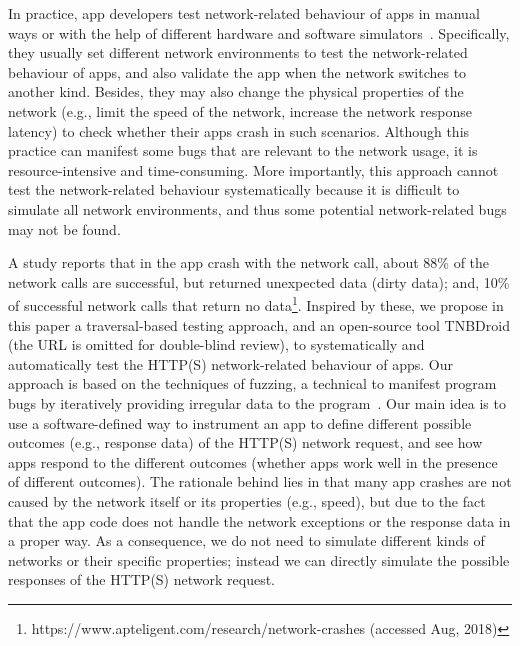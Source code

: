 \documentclass[sigconf,review, anonymous]{acmart}
\begin{document}
In practice, app developers test network-related behaviour of apps in manual ways or with the help of different hardware and software simulators~\cite{LBZKLLTSCZ14,XiongCZXQ18,HuangZJLL19}. Specifically, they usually set different network environments to test the network-related behaviour of apps, and also validate the app when the network switches to another kind. Besides, they may also change the physical properties of the network (e.g., limit the speed of the network, increase the network response latency) to check whether their apps crash in such scenarios. Although this practice can manifest some bugs that are relevant to the network usage, it is resource-intensive and time-consuming. More importantly, this approach cannot test the network-related behaviour systematically because it is difficult to simulate all network environments, and thus some potential network-related bugs may not be found. 

A study reports that in the app crash with the network call, about 88\% of the network calls are successful, but returned unexpected data (dirty data); and, 10\% of successful network calls that return no data\footnote{https://www.apteligent.com/research/network-crashes (accessed Aug, 2018)}. Inspired by these, we propose in this paper a traversal-based testing approach, and an open-source tool \textsf{TNBDroid} (the URL is omitted for double-blind review), to systematically and automatically test the HTTP(S) network-related behaviour of apps. Our approach is based on the techniques of fuzzing, a technical to manifest program bugs by iteratively providing irregular data to the program~\cite{CorinaMSSHKV17,HuangZJLL19}. Our main idea is to use a software-defined way to instrument an app to define different possible outcomes (e.g., response data) of the HTTP(S) network request, and see how apps respond to the different outcomes (whether apps work well in the presence of different outcomes). The rationale behind lies in that many app crashes are not caused by the network itself or its properties (e.g., speed), but due to the fact that the app code does not handle the network exceptions or the response data in a proper way. As a consequence, we do not need to simulate different kinds of networks or their specific properties; instead we can directly simulate the possible responses of the HTTP(S) network request. 
\end{document}
